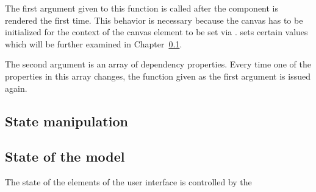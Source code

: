 The first argument given to this function is called after the component is rendered the first time.
This behavior is necessary because the canvas has to be initialized for the context of the canvas element to be set via .
 sets certain values which will be further examined in Chapter~\ref{ch:state_manipulation}.


The second argument is an array of dependency properties.
Every time one of the properties in this array changes, the function given as the first argument is issued again.

\subsection{State manipulation}\label{ch:state_manipulation}
\subsection{State of the  model}\label{ch:state_mec2_model}

The state of the elements of the user interface is controlled by the 
